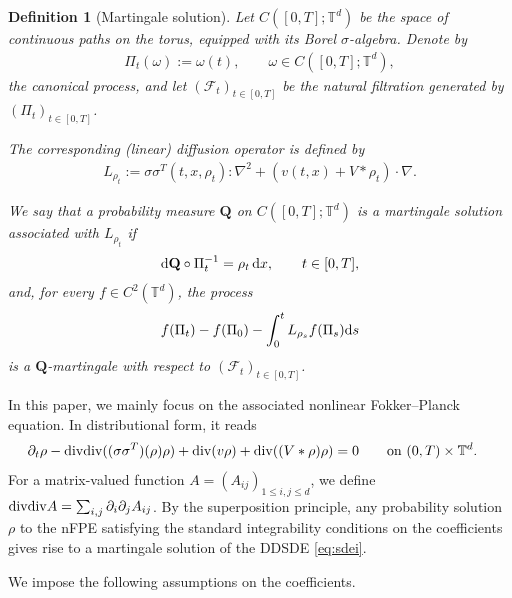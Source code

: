 \documentclass[UTF-8,reqno]{amsart}
\numberwithin{equation}{section}
\newtheorem{definition}[theorem]{Definition}
\theoremstyle{definition}
\def\dif{{\mathord{{\rm d}}}}
\def\leq{\leqslant}
\def\div{\mathord{{\rm div}}}
\def\dif{{\mathord{{\rm d}}}}
\def\leq{\leqslant}
\def\div{\mathord{{\rm div}}}
\begin{document}
\begin{definition}[Martingale solution]
Let $C([0,T];\mathbb{T}^d)$ be the space of continuous paths on the torus,
equipped with its Borel $\sigma$-algebra. Denote by
\begin{align*}
\Pi_t(\omega):=\omega(t),
\qquad
\omega\in C([0,T];\mathbb{T}^d),
\end{align*}
the canonical process, and let $(\mathcal F_t)_{t\in[0,T]}$ be the natural
filtration generated by $(\Pi_t)_{t\in[0,T]}$.

The corresponding (linear)  diffusion operator is defined by
\begin{align*}
L_{\rho_t}:=  \sigma\sigma^{T}(t,x,\rho_t):\nabla^2+(v(t,x)+V*\rho_t)\cdot \nabla.    
\end{align*} 

We say that a probability measure $\mathbf Q$ on
$C([0,T];\mathbb{T}^d)$ is a martingale solution associated with
$L_{\rho_t}$ if
\begin{align*}
\dif\mathbf Q\circ \Pi_t^{-1} =\rho_t \,\dif x,
\qquad
t\in[0,T],
\end{align*}
and, for every $f\in C^2(\mathbb{T}^d)$, the process
\begin{align*}
     f( \Pi_t) -f(\Pi_0)-\int^t_0 L_{\rho_s}f( \Pi_s)\dif s
\end{align*}
is a $\mathbf Q$-martingale with respect to $(\mathcal F_t)_{t\in[0,T]}$.
\end{definition}

In this paper, we mainly focus on the associated nonlinear Fokker--Planck
equation. In distributional form, it reads
\begin{align}
\partial_t \rho-\div\div((\sigma\sigma^{T})(\rho) \rho)+\div(v\rho)+\div((V*\rho)\rho)&=0
\qquad
\text{on } (0,T)\times\mathbb{T}^d. 
\label{eq:fpe:i}
\end{align} 
For a matrix-valued function $A=(A_{ij})_{1\leq i,j\leq d}$, we define
$\div\div A=\sum_{i,j}\partial_i\partial_jA_{ij}$. 
By the superposition principle, any probability solution $\rho$ to the nFPE
  satisfying the standard integrability conditions on the
coefficients gives rise to a martingale solution of the DDSDE \eqref{eq:sdei}.

We  impose the following assumptions on the coefficients.
\end{document}
